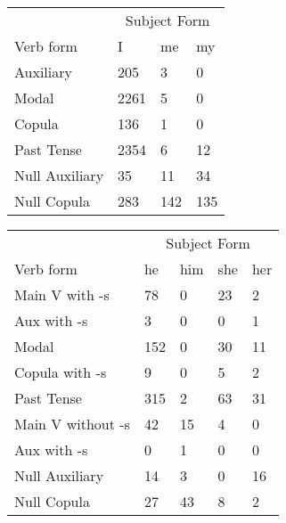 \begin{table}[]
    \begin{minipage}{0.5\textwidth}
    \centering
    \begin{tabular}{@{}llll@{}}
        \toprule
            &\multicolumn{3}{c}{Subject Form}\\
            \cline{2-4}
        Verb form & I & me & my \\
        \midrule
        Auxiliary & 205 & 3 & 0 \\
        Modal & 2261 & 5 & 0 \\
        Copula & 136 & 1 & 0 \\
        Past Tense & 2354 & 6 & 12 \\
        \hline
        Null Auxiliary & 35 & 11 & 34 \\
        Null Copula & 283 & 142 & 135 \\
        \bottomrule
    \end{tabular}
\end{minipage}
\begin{minipage}{0.5\textwidth}
    \centering
    \begin{tabular}{@{}lllll@{}}
        \toprule
            &\multicolumn{4}{c}{Subject Form}\\
            \cline{2-5}
        Verb form & he & him & she & her \\
        \midrule
        Main V with -s & 78 & 0 & 23 & 2 \\
        Aux with -s & 3 & 0 & 0 & 1 \\
        Modal & 152 & 0 & 30 & 11 \\
        Copula with -s & 9 & 0 & 5 & 2 \\
        Past Tense & 315 & 2 & 63 & 31 \\
        \hline
        Main V without -s & 42 & 15 & 4 & 0 \\
        Aux with -s & 0 & 1 & 0 & 0 \\
        Null Auxiliary & 14 & 3 & 0 & 16 \\
        Null Copula & 27 & 43 & 8 & 2 \\
        \bottomrule
    \end{tabular}
\end{minipage}
\end{table}
